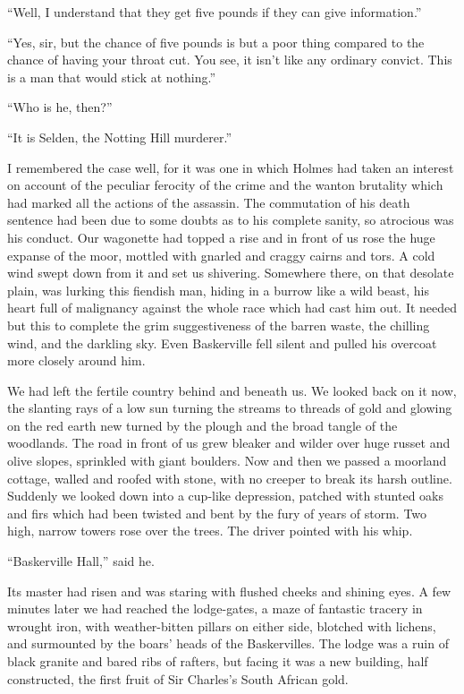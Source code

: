 \documentclass[paper=5.5in:8.5in,BCOR=7mm,twoside,DIV=calc,12pt,usegeometry,openany,chapterprefix,endperiod]{scrbook} %
\begin{document}
\enquote{Well, I understand that they get five pounds if they can give information.}

\enquote{Yes, sir, but the chance of five pounds is but a poor thing compared to the chance of having your throat cut. You see, it isn't like any ordinary convict. This is a man that would stick at nothing.}

\enquote{Who is he, then?}

\enquote{It is Selden, the Notting Hill murderer.}

I remembered the case well, for it was one in which Holmes had taken an interest on account of the peculiar ferocity of the crime and the wanton brutality which had marked all the actions of the assassin. The commutation of his death sentence had been due to some doubts as to his complete sanity, so atrocious was his conduct. Our wagonette had topped a rise and in front of us rose the huge expanse of the moor, mottled with gnarled and craggy cairns and tors. A cold wind swept down from it and set us shivering. Somewhere there, on that desolate plain, was lurking this fiendish man, hiding in a burrow like a wild beast, his heart full of malignancy against the whole race which had cast him out. It needed but this to complete the grim suggestiveness of the barren waste, the chilling wind, and the darkling sky. Even Baskerville fell silent and pulled his overcoat more closely around him.

We had left the fertile country behind and beneath us. We looked back on it now, the slanting rays of a low sun turning the streams to threads of gold and glowing on the red earth new turned by the plough and the broad tangle of the woodlands. The road in front of us grew bleaker and wilder over huge russet and olive slopes, sprinkled with giant boulders. Now and then we passed a moorland cottage, walled and roofed with stone, with no creeper to break its harsh outline. Suddenly we looked down into a cup-like depression, patched with stunted oaks and firs which had been twisted and bent by the fury of years of storm. Two high, narrow towers rose over the trees. The driver pointed with his whip.

\enquote{Baskerville Hall,} said he.

Its master had risen and was staring with flushed cheeks and shining eyes. A few minutes later we had reached the lodge-gates, a maze of fantastic tracery in wrought iron, with weather-bitten pillars on either side, blotched with lichens, and surmounted by the boars' heads of the Baskervilles. The lodge was a ruin of black granite and bared ribs of rafters, but facing it was a new building, half constructed, the first fruit of Sir Charles's South African gold.
\end{document}

